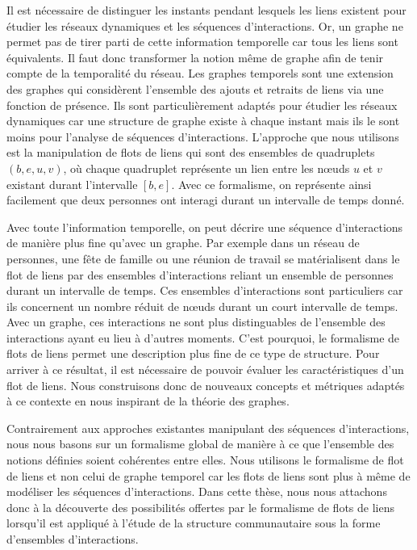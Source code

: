 Il est nécessaire de distinguer les instants pendant lesquels les liens existent pour étudier les réseaux dynamiques et les séquences d'interactions.
Or, un graphe ne permet pas de tirer parti de cette information temporelle car tous les liens sont équivalents. 
Il faut donc transformer la notion même de graphe afin de tenir compte de la temporalité du réseau.
Les graphes temporels sont une extension des graphes qui considèrent l'ensemble des ajouts et retraits de liens via une fonction de présence.
Ils sont particulièrement adaptés pour étudier les réseaux dynamiques car une structure de graphe existe à chaque instant mais ils le sont moins pour l'analyse de séquences d'interactions.
L'approche que nous utilisons est la manipulation de flots de liens qui sont des ensembles de quadruplets $(b, e, u, v)$, où chaque quadruplet représente un lien entre les n\oe uds $u$ et $v$ existant durant l'intervalle $[b,e]$.
Avec ce formalisme, on représente ainsi facilement que deux personnes ont interagi durant un intervalle de temps donné.


Avec toute l'information temporelle, on peut décrire une séquence d'interactions de manière plus fine qu'avec un graphe.
Par exemple dans un réseau de personnes, une fête de famille ou une réunion de travail se matérialisent dans le flot de liens par des ensembles d'interactions reliant un ensemble de personnes durant un intervalle de temps.
Ces ensembles d'interactions sont particuliers car ils concernent un nombre réduit de n\oe uds durant un court intervalle de temps.
Avec un graphe, ces interactions ne sont plus distinguables de l'ensemble des interactions ayant eu lieu à d'autres moments.
C'est pourquoi, le formalisme de flots de liens permet une description plus fine de ce type de structure.
Pour arriver à ce résultat, il est nécessaire de pouvoir évaluer les caractéristiques d'un flot de liens.
Nous construisons donc de nouveaux concepts et métriques adaptés à ce contexte en nous inspirant de la théorie des graphes.


\bigskip


Contrairement aux approches existantes manipulant des séquences d'interactions, nous nous basons sur un formalisme global de manière à ce que l'ensemble des notions définies soient cohérentes entre elles.
Nous utilisons le formalisme de flot de liens et non celui de graphe temporel car les flots de liens sont plus à même de modéliser les séquences d'interactions.
Dans cette thèse, nous nous attachons donc à la découverte des possibilités offertes par le formalisme de flots de liens lorsqu'il est appliqué à l'étude de la structure communautaire sous la forme d'ensembles d'interactions.

